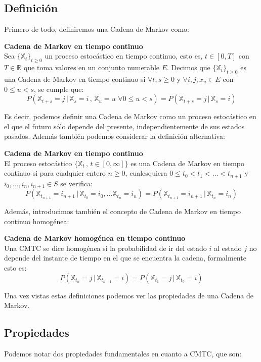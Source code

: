 \documentclass[12pt,a4paper]{article}
\begin{document}
\subsection{Definición}
Primero de todo, definiremos una Cadena de Markov como:
\begin{definition}{\textbf{Cadena de Markov en tiempo continuo}}\\
Sea $\{\mathbb{X}_t\}_{t\geq 0}$ un proceso estocástico en tiempo continuo, esto es, $t\in [0,T]$ con $T\in \mathbb{R}$ que toma valores en un conjunto numerable $E$. Decimos que $\{\mathbb{X}_t\}_{t\geq 0}$ es una Cadena de Markov en tiempo continuo si $\forall t,s\geq 0$ y $\forall i,j,x_u\in E$ con $0\leq u < s$, se cumple que:
$$P(\mathbb{X}_{t+s}=j \, | \, \mathbb{X}_s =i \, , \,  \mathbb{X}_u =  u \,\, \forall 0\leq u <s)=P(\mathbb{X}_{t+s}=j \, | \, \mathbb{X}_s = i)$$
\end{definition}
Es decir, podemos definir una Cadena de Markov como un proceso estocástico	en el que el futuro sólo depende del presente, independientemente de sus estados pasados. Además también podemos considerar la definición alternativa:
\begin{definition}{\textbf{Cadena de Markov en tiempo continuo}}\\
El proceso estocástico $\{\mathbb{X}_t \, , \, t\in [0,\infty]\}$ es una Cadena de Markov en tiempo continuo si para cualquier entero $n\geq 0$, cualesquiera $0\leq t_0 < t_1 < \ldots < t_{n+1}$ y $i_0,\ldots , i_n,i_{n+1}\in S$ se verifica:
$$P(\mathbb{X}_{t_{n+1}}=i_{n+1}\, | \, \mathbb{X}_{t_0}=i_0 , \ldots \mathbb{X}_{t_n}=i_n)=P(\mathbb{X}_{t_{n+1}}=i_{n+1}\, | \, \mathbb{X}_{t_n}=i_n)$$
\end{definition}
Además, introducimos también el concepto de Cadena de Markov en tiempo continuo homogénea:
\begin{definition}{\textbf{Cadena de Markov homogénea en tiempo continuo}}\\
Una CMTC se dice homogénea si la probabilidad de ir del estado $i$ al estado $j$ no depende del instante de tiempo en el que se encuentra la cadena, formalmente esto es:
$$P(\mathbb{X}_{t_n}=j \, | \, \mathbb{X}_{t_{n-1}}=i)=P(\mathbb{X}_{t_1}=j \, | \, \mathbb{X}_{t_0}=i)$$
\end{definition}
Una vez vistas estas definiciones podemos ver las propiedades de una Cadena de Markov.
\subsection{Propiedades}
Podemos notar dos propiedades fundamentales en cuanto a CMTC, que son:
\end{document}
